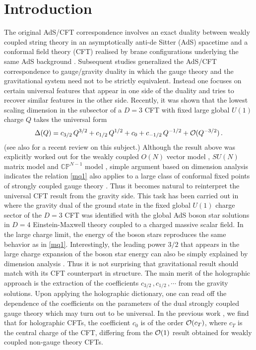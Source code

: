 \documentclass[11pt]{article}
\newcommand{\be}{\begin{equation}}
\newcommand{\ee}{\end{equation}}
\begin{document}

\newpage

\section{Introduction}

The original AdS/CFT correspondence involves an exact duality between weakly coupled string theory in an asymptotically anti-de Sitter (AdS) spacetime and a conformal field theory (CFT) realised by brane configurations underlying the same AdS background \cite{Maldacena:1997re}. Subsequent studies generalized the AdS/CFT correspondence to gauge/gravity duality in which the gauge theory and the gravitational system need not to be strictly equivalent. Instead one focuses on certain universal features that appear in one side of the duality and tries to recover similar features in the other side. Recently, it was shown that the lowest scaling dimension in the subsector of a $D=3$ CFT with fixed large global $U(1)$ charge $Q$ takes the universal form \cite{Orlando1,Orlando2,Orlando3,Monin:2016jmo,Loukas:2018zjh,delaFuente:2018qwv,Badel:2019khk}
\be
\label{mq1}
\Delta(Q)=c_{3/2}\, Q^{3/2}+c_{1/2}\, Q^{1/2}+c_0+ c_{-1/2}\, Q^{-1/2} + {\cal O}(Q^{-3/2})\,.
\ee
(see also \cite{Gaume:2020bmp} for a recent review on this subject.) Although the result above was explicitly worked out for the weakly coupled $O(N)$ vector model \cite{Orlando1,Orlando2}, $SU(N)$ matrix model \cite{Orlando3} and $\mathbb{CP}^{N-1}$ model \cite{delaFuente:2018qwv}, simple argument based on dimension analysis indicates the relation \eqref{mq1} also applies to a large class of conformal fixed points of strongly coupled gauge theory \cite{Jafferis:2017zna}. Thus it becomes natural to reinterpret the universal CFT result from the gravity side.  This task has been carried out in \cite{delaFuente:2020yua,Liu:2020uaz} where the gravity dual of the ground state in the fixed global $U(1)$ charge sector of the $D=3$ CFT was identified with the global AdS boson star solutions in $D=4$ Einstein-Maxwell theory coupled to a charged massive scalar field. In the large charge limit, the energy of the boson stars reproduces the same behavior as in \eqref{mq1}. Interestingly, the leading power $3/2$ that appears in the large charge expansion of the boson star energy can also be simply explained by dimension analysis \cite{Gentle:2011kv}. Thus it is not surprising that gravitational result should match with its CFT counterpart in structure. The main merit of the holographic approach is the extraction of the coefficients $c_{3/2}\,,c_{1/2}\,,\cdots$ from the gravity solutions. Upon applying the holographic dictionary, one can read off the dependence of the coefficients on the parameters of the dual strongly coupled gauge theory which may turn out to be universal. In the previous work \cite{Liu:2020uaz}, we find that for holographic CFTs, the coefficient $c_0$ is of the order ${\cal O}(c_T)$, where $c_T$ is the central charge of the CFT, differing from the ${\cal O}(1)$ result obtained for weakly coupled non-gauge theory CFTs.
\end{document}
